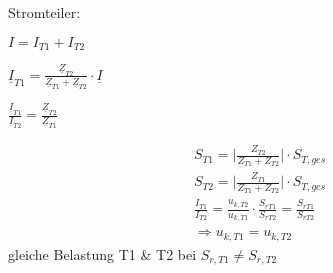 	Stromteiler:

	$I = I_{T1} + I_{T2}$

	$\underline{I}_{T1} = \frac{\underline{Z}_{T2}}{\underline{Z}_{T1}+\underline{Z}_{T2}}\cdot \underline{I}$

	$\frac{\underline{I}_{T1}}{\underline{I}_{T2}} = \frac{\underline{Z}_{T2}}{\underline{Z}_{T1}}$

	\begin{gather*}
		S_{T1} = \Big|\frac{Z_{T2}}{Z_{T1} + Z_{T2}}\Big| \cdot S_{T,ges}\\
		S_{T2} = \Big|\frac{Z_{T1}}{Z_{T1} + Z_{T2}}\Big| \cdot S_{T,ges}\\
		\frac{I_{T1}}{I_{T2}}=\frac{u_{k,T2}}{u_{k,T1}} \cdot \frac{S_{rT1}}{S_{rT2}}=\frac{S_{rT1}}{S_{rT2}}\\
		\Rightarrow u_{k,T1} = u_{k,T2}
		\frac{}{}
	\end{gather*}
	gleiche Belastung T1 \& T2 bei $S_{r,T1} \neq S_{r,T2}$
	